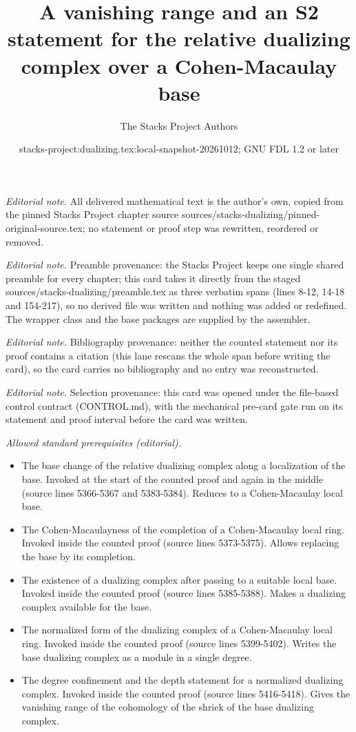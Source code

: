 \documentclass[10pt,a4paper]{amsart}
\title{A vanishing range and an S2 statement for the relative dualizing complex over a Cohen-Macaulay base}
\author{The Stacks Project Authors}
\date{stacks-project:dualizing.tex:local-snapshot-20261012; GNU FDL 1.2 or later}
\theoremstyle{plain}
\theoremstyle{definition}
\theoremstyle{remark}
\numberwithin{equation}{subsection}
\begin{document}
\maketitle
\noindent\textit{Editorial note.} All delivered mathematical text is the author's own, copied from the pinned Stacks Project chapter source sources/stacks-dualizing/pinned-original-source.tex; no statement or proof step was rewritten, reordered or removed.\par\medskip
\noindent\textit{Editorial note.} Preamble provenance: the Stacks Project keeps one single shared preamble for every chapter; this card takes it directly from the staged sources/stacks-dualizing/preamble.tex as three verbatim spans (lines 8-12, 14-18 and 154-217), so no derived file was written and nothing was added or redefined. The wrapper class and the base packages are supplied by the assembler.\par\medskip
\noindent\textit{Editorial note.} Bibliography provenance: neither the counted statement nor its proof contains a citation (this lane rescans the whole span before writing the card), so the card carries no bibliography and no entry was reconstructed.\par\medskip
\noindent\textit{Editorial note.} Selection provenance: this card was opened under the file-based control contract (CONTROL.md), with the mechanical pre-card gate run on its statement and proof interval before the card was written.\par\medskip
\noindent\textit{Allowed standard prerequisites (editorial).}\begin{itemize}
\item The base change of the relative dualizing complex along a localization of the base. Invoked at the start of the counted proof and again in the middle (source lines 5366-5367 and 5383-5384). Reduces to a Cohen-Macaulay local base.
\item The Cohen-Macaulayness of the completion of a Cohen-Macaulay local ring. Invoked inside the counted proof (source lines 5373-5375). Allows replacing the base by its completion.
\item The existence of a dualizing complex after passing to a suitable local base. Invoked inside the counted proof (source lines 5385-5388). Makes a dualizing complex available for the base.
\item The normalized form of the dualizing complex of a Cohen-Macaulay local ring. Invoked inside the counted proof (source lines 5399-5402). Writes the base dualizing complex as a module in a single degree.
\item The degree confinement and the depth statement for a normalized dualizing complex. Invoked inside the counted proof (source lines 5416-5418). Gives the vanishing range of the cohomology of the shriek of the base dualizing complex.
\end{itemize}\medskip
\end{document}
